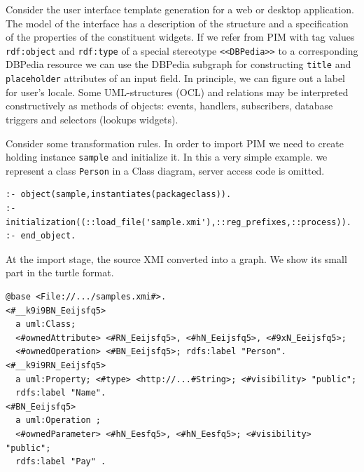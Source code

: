 \documentclass[runningheads]{llncs}
\begin{document}
Consider the user interface template generation for a web or desktop application.  The model of the interface has a description of the structure and a specification of the properties of the constituent widgets.  If we refer from PIM with tag values \texttt{rdf:object} and \texttt{rdf:type} of a special stereotype \texttt{<<DBPedia>>} to a corresponding DBPedia resource we can use the DBPedia subgraph for constructing \texttt{title} and \texttt{placeholder} attributes of an input field.  In principle, we can figure out a label for user's locale.
Some UML-structures (OCL) and relations may be interpreted constructively as methods of objects: events, handlers, subscribers, database triggers and selectors (lookups widgets).



Consider some transformation rules. In order to import PIM we need to create holding instance \texttt{sample} and initialize it. In this a very simple example. we represent a class \texttt{Person} in a Class diagram, server access code is omitted.
\begin{verbatim}
:- object(sample,instantiates(packageclass)).
:- initialization((::load_file('sample.xmi'),::reg_prefixes,::process)).
:- end_object.
\end{verbatim}
At the import stage, the source XMI converted into a graph.  We show its small part in the turtle format.
\begin{verbatim}
@base <File://.../samples.xmi#>.
<#__k9i9BN_Eeijsfq5>
  a uml:Class;
  <#ownedAttribute> <#RN_Eeijsfq5>, <#hN_Eeijsfq5>, <#9xN_Eeijsfq5>;
  <#ownedOperation> <#BN_Eeijsfq5>; rdfs:label "Person".
<#__k9i9RN_Eeijsfq5>
  a uml:Property; <#type> <http://...#String>; <#visibility> "public";
  rdfs:label "Name".
<#BN_Eeijsfq5>
  a uml:Operation ;
  <#ownedParameter> <#hN_Eesfq5>, <#hN_Eesfq5>; <#visibility> "public";
  rdfs:label "Pay" .
\end{verbatim}
\end{document}
